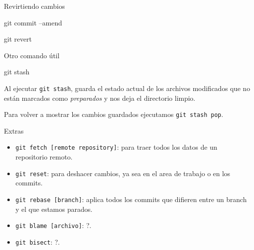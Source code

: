 \begin{frame}[t]{Revirtiendo cambios}
    \begin{comando}
        git commit --amend
    \end{comando}


    \vspace{2em}

    \begin{comando}
        git revert
    \end{comando}

\end{frame}

\begin{frame}[t]{Otro comando útil}
    \begin{comando}
        git stash
    \end{comando}

    \pause
    \begin{block}{}
        Al ejecutar \texttt{git stash}, guarda el estado actual de los archivos modificados que no están marcados como \textit{preparados} y nos deja el directorio limpio.

        \vspace{0.5em}

        Para volver a mostrar los cambios guardados ejecutamos \texttt{git stash pop}.
    \end{block}
\end{frame}

\begin{frame}[t]{Extras}

    \begin{itemize}
        \item \texttt{git fetch [remote repository]}: para traer todos los datos de un repositorio remoto.
        \item \texttt{git reset}: para deshacer cambios, ya sea en el area de trabajo o en los commits.
        \item \texttt{git rebase [branch]}: aplica todos los commits que difieren entre un branch y el que estamos parados.
        \item \texttt{git blame [archivo]}: ?.
        \item \texttt{git bisect}: ?.
    \end{itemize}

\end{frame}

